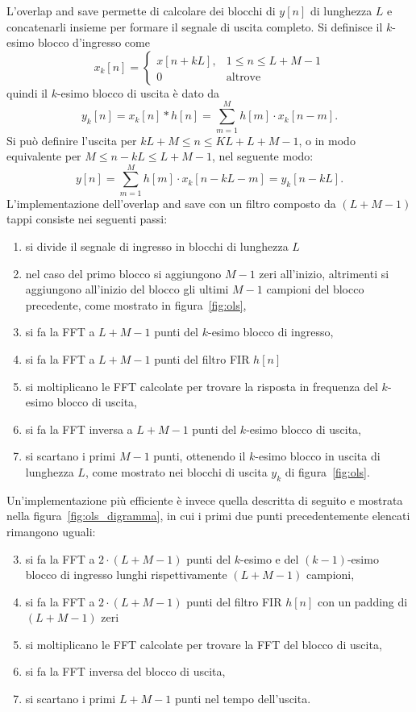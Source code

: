 \documentclass[12pt,a4paper,titlepage]{article}
\begin{document}
L'overlap and save permette di calcolare dei blocchi di $y[n]$ di lunghezza $L$ e concatenarli insieme per formare il segnale di uscita completo. Si definisce il $k$-esimo blocco d'ingresso come
\begin{equation}
x_k[n] = 
\begin{cases}
x[n+kL], & 1 \leq n \leq L + M - 1\\
0 & \text{altrove}
\end{cases}
\end{equation}
quindi il $k$-esimo blocco di uscita è dato da 
\begin{equation}
y_k[n] = x_k[n] * h[n] = \sum_{m=1}^{M} {h[m] \cdot x_k[n-m]}.
\end{equation}
Si può definire l'uscita per $kL + M \leq n \leq KL + L +M - 1$, o in modo equivalente per $M \leq n - kL \leq L + M - 1$, nel seguente modo:
\begin{equation}
y[n] = \sum_{m=1}^{M} {h[m] \cdot x_k[n-kL-m]} = y_k[n - kL].
\end{equation}
L'implementazione dell'overlap and save con un filtro composto da $(L + M - 1)$ tappi consiste nei seguenti passi:
\begin{enumerate}
\item si divide il segnale di ingresso in blocchi di lunghezza $L$
\item nel caso del primo blocco si aggiungono $M - 1$ zeri all'inizio, altrimenti si aggiungono all'inizio del blocco gli ultimi $M - 1$ campioni del blocco precedente, come mostrato in figura~\ref{fig:ols},
\item si fa la FFT a $L + M - 1$ punti del $k$-esimo blocco di ingresso,
\item si fa la FFT a $L + M - 1$ punti del filtro FIR $h[n]$
\item si moltiplicano le FFT calcolate per trovare la risposta in frequenza del $k$-esimo blocco di uscita,
\item si fa la FFT inversa a $L + M - 1$ punti del $k$-esimo blocco di uscita,
\item si scartano i primi $M - 1$ punti, ottenendo il $k$-esimo blocco in uscita di lunghezza $L$, come mostrato nei blocchi di uscita $y_k$ di figura~\ref{fig:ols}.
\end{enumerate}

Un'implementazione più efficiente è invece quella descritta di seguito e mostrata nella figura~\ref{fig:ols_digramma}, in cui i primi due punti precedentemente elencati rimangono uguali:
\begin{enumerate}\setcounter{enumi}{2}
\item si fa la FFT a $2 \cdot (L + M - 1)$ punti del $k$-esimo e del $(k-1)$-esimo blocco di ingresso lunghi rispettivamente $(L + M - 1)$ campioni,
\item si fa la FFT a $2 \cdot (L + M - 1)$ punti del filtro FIR $h[n]$ con un padding di $(L + M - 1)$ zeri
\item si moltiplicano le FFT calcolate per trovare la FFT del blocco di uscita,
\item si fa la FFT inversa del blocco di uscita,
\item si scartano i primi $L + M - 1$ punti nel tempo dell'uscita.
\end{enumerate}
\end{document}
